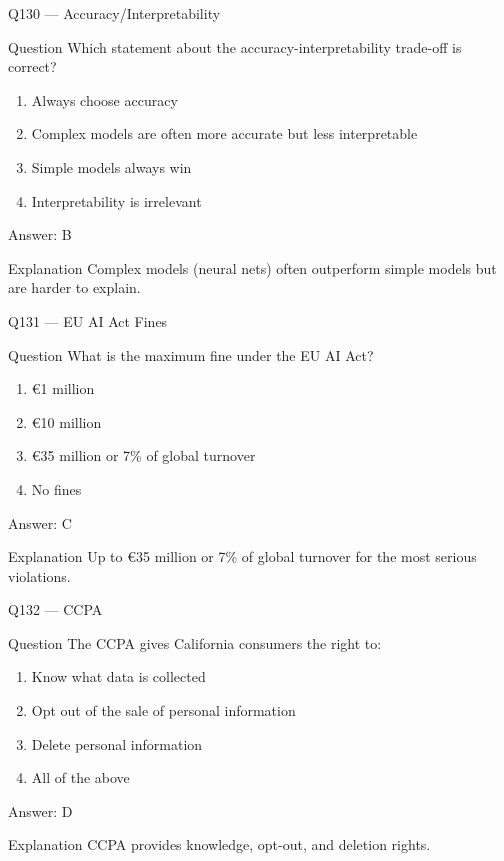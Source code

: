 \documentclass[aspectratio=169,8pt]{beamer}
\begin{document}
	\begin{frame}{Q130 --- Accuracy/Interpretability}
		\begin{block}{Question}
			Which statement about the accuracy-interpretability trade-off is correct?
		\end{block}
		\begin{enumerate}
			\item Always choose accuracy
			\item Complex models are often more accurate but less interpretable
			\item Simple models always win
			\item Interpretability is irrelevant
		\end{enumerate}
		\begin{exampleblock}{Answer: B}\end{exampleblock}
		\begin{block}{Explanation}
			Complex models (neural nets) often outperform simple models but are harder to explain.
		\end{block}
	\end{frame}
	
	\begin{frame}{Q131 --- EU AI Act Fines}
		\begin{block}{Question}
			What is the maximum fine under the EU AI Act?
		\end{block}
		\begin{enumerate}
			\item €1 million
			\item €10 million
			\item €35 million or 7\% of global turnover
			\item No fines
		\end{enumerate}
		\begin{exampleblock}{Answer: C}\end{exampleblock}
		\begin{block}{Explanation}
			Up to €35 million or 7\% of global turnover for the most serious violations.
		\end{block}
	\end{frame}
	
	\begin{frame}{Q132 --- CCPA}
		\begin{block}{Question}
			The CCPA gives California consumers the right to:
		\end{block}
		\begin{enumerate}
			\item Know what data is collected
			\item Opt out of the sale of personal information
			\item Delete personal information
			\item All of the above
		\end{enumerate}
		\begin{exampleblock}{Answer: D}\end{exampleblock}
		\begin{block}{Explanation}
			CCPA provides knowledge, opt-out, and deletion rights.
		\end{block}
	\end{frame}
	
\end{document}
